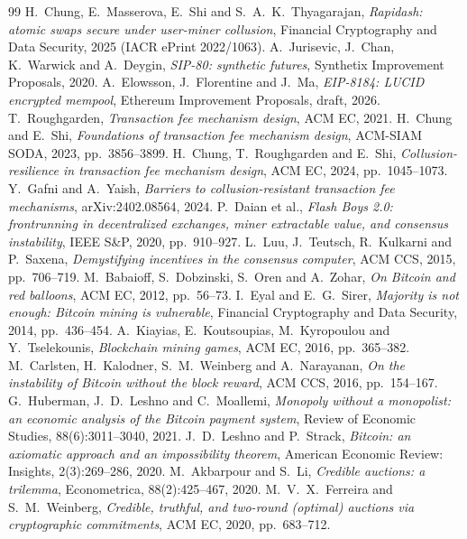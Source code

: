 \documentclass[11pt]{article}
\begin{document}
\begin{thebibliography}{99}
 H.~Chung, E.~Masserova, E.~Shi and S.~A.~K.~Thyagarajan, \emph{Rapidash: atomic swaps secure under user-miner collusion}, Financial Cryptography and Data Security, 2025 (IACR ePrint 2022/1063).
 A.~Jurisevic, J.~Chan, K.~Warwick and A.~Deygin, \emph{SIP-80: synthetic futures}, Synthetix Improvement Proposals, 2020.
 A.~Elowsson, J.~Florentine and J.~Ma, \emph{EIP-8184: LUCID encrypted mempool}, Ethereum Improvement Proposals, draft, 2026.
 T.~Roughgarden, \emph{Transaction fee mechanism design}, ACM EC, 2021.
 H.~Chung and E.~Shi, \emph{Foundations of transaction fee mechanism design}, ACM-SIAM SODA, 2023, pp.~3856--3899.
 H.~Chung, T.~Roughgarden and E.~Shi, \emph{Collusion-resilience in transaction fee mechanism design}, ACM EC, 2024, pp.~1045--1073.
 Y.~Gafni and A.~Yaish, \emph{Barriers to collusion-resistant transaction fee mechanisms}, arXiv:2402.08564, 2024.
 P.~Daian et al., \emph{Flash Boys 2.0: frontrunning in decentralized exchanges, miner extractable value, and consensus instability}, IEEE S\&P, 2020, pp.~910--927.
 L.~Luu, J.~Teutsch, R.~Kulkarni and P.~Saxena, \emph{Demystifying incentives in the consensus computer}, ACM CCS, 2015, pp.~706--719.
 M.~Babaioff, S.~Dobzinski, S.~Oren and A.~Zohar, \emph{On Bitcoin and red balloons}, ACM EC, 2012, pp.~56--73.
 I.~Eyal and E.~G.~Sirer, \emph{Majority is not enough: Bitcoin mining is vulnerable}, Financial Cryptography and Data Security, 2014, pp.~436--454.
 A.~Kiayias, E.~Koutsoupias, M.~Kyropoulou and Y.~Tselekounis, \emph{Blockchain mining games}, ACM EC, 2016, pp.~365--382.
 M.~Carlsten, H.~Kalodner, S.~M.~Weinberg and A.~Narayanan, \emph{On the instability of Bitcoin without the block reward}, ACM CCS, 2016, pp.~154--167.
 G.~Huberman, J.~D.~Leshno and C.~Moallemi, \emph{Monopoly without a monopolist: an economic analysis of the Bitcoin payment system}, Review of Economic Studies, 88(6):3011--3040, 2021.
 J.~D.~Leshno and P.~Strack, \emph{Bitcoin: an axiomatic approach and an impossibility theorem}, American Economic Review: Insights, 2(3):269--286, 2020.
 M.~Akbarpour and S.~Li, \emph{Credible auctions: a trilemma}, Econometrica, 88(2):425--467, 2020.
 M.~V.~X.~Ferreira and S.~M.~Weinberg, \emph{Credible, truthful, and two-round (optimal) auctions via cryptographic commitments}, ACM EC, 2020, pp.~683--712.

\end{thebibliography}
\end{document}
